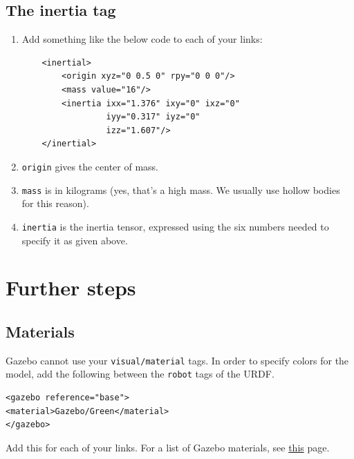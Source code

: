 \documentclass{article}
\begin{document}
        \subsection{The inertia tag}
            \begin{enumerate}
                \item Add something like the below code to each of your links:
                \begin{verbatim}
    <inertial>
        <origin xyz="0 0.5 0" rpy="0 0 0"/>
        <mass value="16"/>
        <inertia ixx="1.376" ixy="0" ixz="0" 
                 iyy="0.317" iyz="0" 
                 izz="1.607"/>
    </inertial>
                \end{verbatim}
                \item \texttt{origin} gives the center of mass. 
                \item \texttt{mass} is in kilograms (yes, that's a high mass. We usually use hollow bodies for this reason).
                \item \texttt{inertia} is the inertia tensor, expressed using the six numbers needed to specify it as given above.
            \end{enumerate}
    \section{Further steps}
        \subsection{Materials}
        Gazebo cannot use your \texttt{visual/material} tags. In order to 
        specify colors for the model, add the following between the \texttt{robot} tags 
        of the URDF.
        \begin{verbatim}
<gazebo reference="base">
<material>Gazebo/Green</material>
</gazebo>
        \end{verbatim}
        Add this for each of your links. For a list of Gazebo 
        materials, see \href{http://wiki.ros.org/simulator_gazebo/Tutorials/ListOfMaterials}{this} page.
\end{document}
